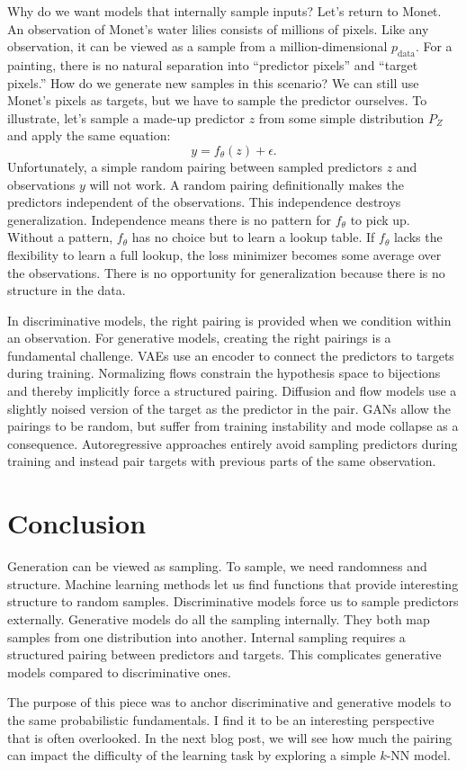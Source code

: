 \documentclass[11pt]{article}
\begin{document}
Why do we want models that internally sample inputs? Let's return to Monet. An observation of Monet's water lilies consists of millions of pixels. Like any observation, it can be viewed as a sample from a million-dimensional $p_{\text{data}}$. For a painting, there is no natural separation into ``predictor pixels'' and ``target pixels.'' How do we generate new samples in this scenario? We can still use Monet's pixels as targets, but we have to sample the predictor ourselves. To illustrate, let's sample a made-up predictor $z$ from some simple distribution $P_Z$ and apply the same equation:
\begin{equation*}
    y = f_{\theta}(z) + \epsilon.
\end{equation*}
Unfortunately, a simple random pairing between sampled predictors $z$ and observations $y$ will not work. A random pairing definitionally makes the predictors independent of the observations. This independence destroys generalization. Independence means there is no pattern for $f_{\theta}$ to pick up. Without a pattern, $f_{\theta}$ has no choice but to learn a lookup table. If $f_{\theta}$ lacks the flexibility to learn a full lookup, the loss minimizer becomes some average over the observations. There is no opportunity for generalization because there is no structure in the data.

In discriminative models, the right pairing is provided when we condition within an observation. For generative models, creating the right pairings is a fundamental challenge. VAEs use an encoder to connect the predictors to targets during training. Normalizing flows constrain the hypothesis space to bijections and thereby implicitly force a structured pairing. Diffusion and flow models use a slightly noised version of the target as the predictor in the pair. GANs allow the pairings to be random, but suffer from training instability and mode collapse as a consequence. Autoregressive approaches entirely avoid sampling predictors during training and instead pair targets with previous parts of the same observation.

\section*{Conclusion}

Generation can be viewed as sampling. To sample, we need randomness and structure. Machine learning methods let us find functions that provide interesting structure to random samples. Discriminative models force us to sample predictors externally. Generative models do all the sampling internally. They both map samples from one distribution into another. Internal sampling requires a structured pairing between predictors and targets. This complicates generative models compared to discriminative ones.

The purpose of this piece was to anchor discriminative and generative models to the same probabilistic fundamentals. I find it to be an interesting perspective that is often overlooked. In the next blog post, we will see how much the pairing can impact the difficulty of the learning task by exploring a simple $k$-NN model.
\end{document}
